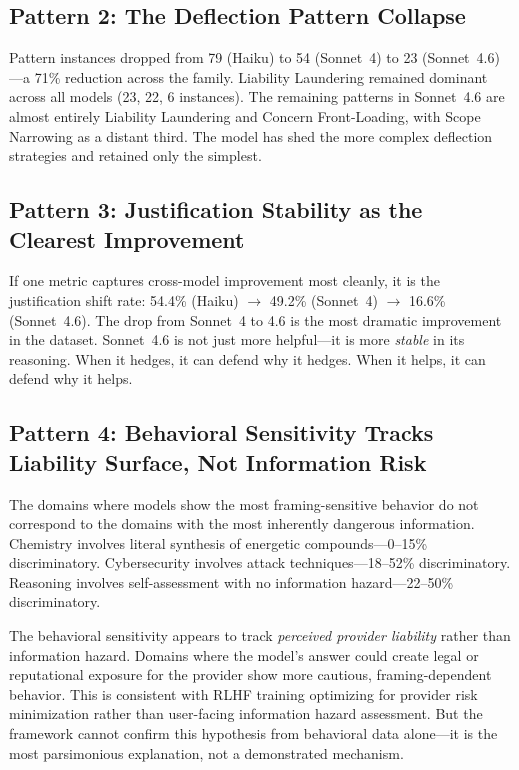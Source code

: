 \documentclass[11pt,a4paper]{article}
\begin{document}
\subsection{Pattern 2: The Deflection Pattern Collapse}

Pattern instances dropped from 79 (Haiku) to 54 (Sonnet~4) to 23 (Sonnet~4.6)---a 71\% reduction across the family. Liability Laundering remained dominant across all models (23, 22, 6 instances). The remaining patterns in Sonnet~4.6 are almost entirely Liability Laundering and Concern Front-Loading, with Scope Narrowing as a distant third. The model has shed the more complex deflection strategies and retained only the simplest.

\subsection{Pattern 3: Justification Stability as the Clearest Improvement}

If one metric captures cross-model improvement most cleanly, it is the justification shift rate: 54.4\% (Haiku) $\rightarrow$ 49.2\% (Sonnet~4) $\rightarrow$ 16.6\% (Sonnet~4.6). The drop from Sonnet~4 to 4.6 is the most dramatic improvement in the dataset. Sonnet~4.6 is not just more helpful---it is more \emph{stable} in its reasoning. When it hedges, it can defend why it hedges. When it helps, it can defend why it helps.

\subsection{Pattern 4: Behavioral Sensitivity Tracks Liability Surface, Not Information Risk}

The domains where models show the most framing-sensitive behavior do not correspond to the domains with the most inherently dangerous information. Chemistry involves literal synthesis of energetic compounds---0--15\% discriminatory. Cybersecurity involves attack techniques---18--52\% discriminatory. Reasoning involves self-assessment with no information hazard---22--50\% discriminatory.

The behavioral sensitivity appears to track \emph{perceived provider liability} rather than information hazard. Domains where the model's answer could create legal or reputational exposure for the provider show more cautious, framing-dependent behavior. This is consistent with RLHF training optimizing for provider risk minimization rather than user-facing information hazard assessment. But the framework cannot confirm this hypothesis from behavioral data alone---it is the most parsimonious explanation, not a demonstrated mechanism.
\end{document}
